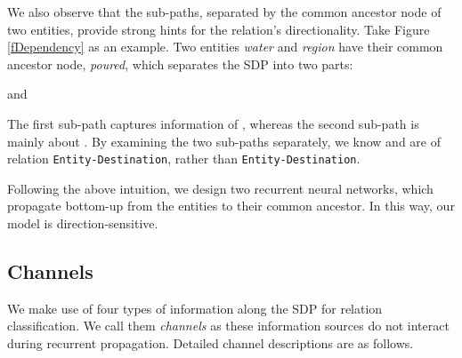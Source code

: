 \documentclass[11pt,a4paper]{article}
\begin{document}
We also observe that the sub-paths, separated by
the common ancestor node of two entities,
provide strong hints for the relation's directionality.
Take Figure \ref{fDependency} as an example.
Two entities \textit{water} and \textit{region}
have their common ancestor node, \textit{poured}, which
separates the SDP into two parts:

and

The first sub-path captures information of , whereas the second sub-path
is mainly about .
By examining the two sub-paths separately, we know  and  are
of relation \verb|Entity-|\verb|Destination|, rather
than \verb|Entity-Destination|.

Following the above intuition,
we design two recurrent neural networks,
which propagate bottom-up from the entities to their common ancestor.
In this way, our model is direction-sensitive.

\subsection{Channels}\label{ssChannels}
We make use of four types of information along the SDP for relation classification.
We call them \textit{channels} as these information sources do not interact during
recurrent propagation. 
Detailed channel descriptions are as follows.
\end{document}
